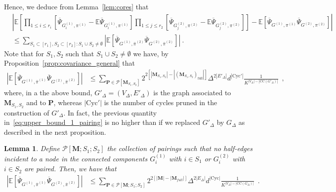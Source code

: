 \documentclass{article}
\newtheorem{lemma}{Lemma}
\begin{document}
    Hence, we deduce from Lemma~\ref{lem:cores} that 
    \begin{align}\nonumber
        &\left|\mathbb{E}\left[\prod_{1\leq i\leq r_i}\left[\overline{\Psi}_{G^{(1)}_i, \pi^{(1)}} - \mathbb E \overline{\Psi}_{G^{(1)}_i, \pi^{(1)}}\right]\prod_{1\leq j\leq r_2} \left[\overline{\Psi}_{G^{(2)}_j, \pi^{(2)}} - \mathbb E\overline{\Psi}_{G^{(2)}_j, \pi^{(2)}}\right]\right] - \mathbb E[\overline{\Psi}_{G^{(1)}, \pi^{(1)}}\overline{\Psi}_{G^{(2)}, \pi^{(2)}}]\right|\\ \label{eq:upper_mixed_moment}
        &\leq \sum_{S_1 \subset [r_1], S_2\subset [r_2]: S_1\cup S_2 \neq \emptyset}  \left|\mathbb{E}\left[ \overline{\Psi}_{G^{(1)}, \overline{\pi}^{(2)}}  \overline{\Psi}_{G^{(2)}, \overline{\pi}^{(2)}} \right]\right|\ .
        \end{align}
        Note that for $S_1,S_2$ such that $S_1\cup S_2 \neq \emptyset$ we have, by Proposition~\ref{prop:covariance_general} that
        \begin{eqnarray}\label{eq:upper_bound_1_pairing}
            \left|\mathbb{E}\left[ \overline{\Psi}_{G^{(1)}, \overline{\pi}^{(1) }}  \overline{\Psi}_{G^{(2)}, \overline{\pi}^{(2)}}\right]  \right|&\leq   \sum_{\mathbf{P}\in \mathcal{P}[\mathbf{M}_{S_1,S_2}]}2^{2[|\mathbf{M}_{S_1,S_2}| - |(\mathbf{M}_{S_1,S_2})_{\mathrm{full}}|] }\Delta^{2|E'_{\Delta}|}d^{|\mathrm{Cyc}'|}\frac{1}{K^{|V_{\Delta}|-|\mathrm{CC}(G'_{\Delta})|}}\enspace , 
        \end{eqnarray}
        where, in a the above bound,  $G'_{\Delta}=(V_\Delta,E'_{\Delta})$ is the graph  associated to $\mathbf{M}_{S_1,S_2}$ and to $\mathbf{P}$, whereas $|\mathrm{Cyc}'|$ is the number of cycles pruned in the construction of $G'_{\Delta}$. In fact, the previous quantity in~\eqref{eq:upper_bound_1_pairing} is no higher than if we replaced $G'_{\Delta}$ by $G_{\Delta}$ as described in the next proposition.
    
    \begin{lemma}\label{lem:core2}
    Define $\mathcal{P}[\mathbf{M}; S_1;S_2]$ the collection of pairings such that no half-edges incident to a node in the connected components $G^{(1)}_i$ with $i\in S_1$ or $G^{(2)}_i$ with $i\in S_2$ are paired. Then, we have  that 
       \begin{eqnarray}\label{eq:upper_bound_2_pairing}
            \left|\mathbb{E}\left[ \overline{\Psi}_{G^{(1)}, \overline{\pi}^{(1)}}  \overline{\Psi}_{G^{(2)}, \overline{\pi}^{(2)}}\right]  \right|&\leq   \sum_{\mathbf{P}\in \mathcal{P}[\mathbf{M};S_1;S_2]}2^{2[|\mathbf{M}| - |\mathbf{M}_{full}|]} \Delta^{2|E_{\Delta}|}d^{|\mathrm{Cyc}|}\frac{1}{K^{|V_{\Delta}|-|\mathrm{CC}(G_{\Delta})|}}\enspace .
        \end{eqnarray}
    \end{lemma}
\end{document}
